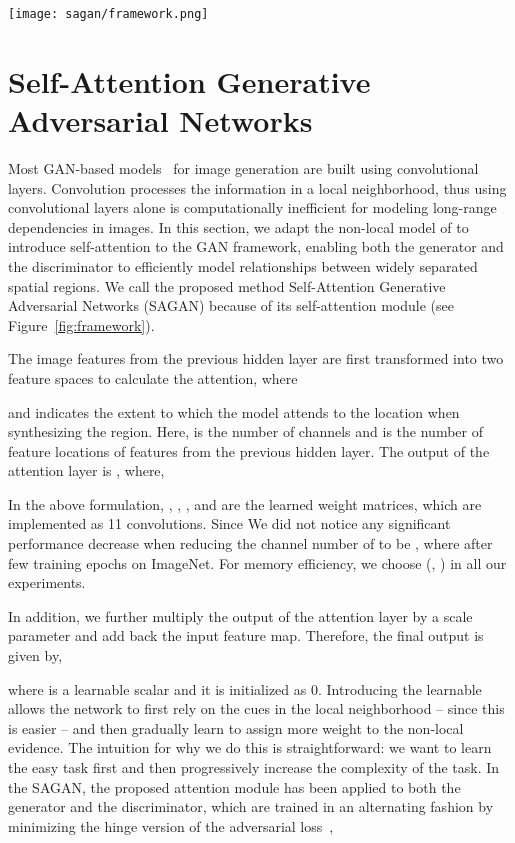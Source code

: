 \documentclass{article}
\begin{document}
\begin{figure*}[tb]
\centering
\texttt{[image: sagan/framework.png]}
\caption{The proposed self-attention module for the SAGAN. The  denotes matrix multiplication. The softmax operation is performed on each row.}
\label{fig:framework}
\end{figure*}



\section{Self-Attention Generative Adversarial Networks} \label{sec:sagan_sagan} 

Most GAN-based models~\cite{Radford15, Salimans2016, KarrasALL18} for image generation are built using convolutional layers. Convolution processes the information in a local neighborhood, thus using convolutional layers alone is computationally inefficient for modeling long-range dependencies in images.
In this section, we adapt the non-local model of \cite{Wang18} to introduce self-attention to the GAN framework, enabling both the generator and the discriminator to efficiently model relationships between widely separated spatial regions. We call the proposed method Self-Attention Generative Adversarial Networks (SAGAN) because of its self-attention module (see Figure~\ref{fig:framework}).


The image features from the previous hidden layer   are first transformed into two feature spaces  to calculate the attention, where 

and  indicates the extent to which the model attends to the  location when synthesizing the  region. Here,  is the number of channels and  is the number of feature locations of features from the previous hidden layer.
The output of the attention layer is , where,

In the above formulation, , , , and  are the learned weight matrices, which are implemented as  11 convolutions. 
Since We did not notice any significant performance decrease when reducing the channel number of  to be , where  after few training epochs on ImageNet. For memory efficiency, we choose  (\ie, ) in all our experiments. 


In addition, we further multiply the output of the attention layer by a scale parameter and add back the input feature map. Therefore, the final output is given by, 


where  is a learnable scalar and it is initialized as 0.
Introducing the learnable  allows the network to first rely on the cues in the local neighborhood -- since this is easier -- and then gradually learn to assign more weight to the non-local evidence.
The intuition for why we do this is straightforward: we want to learn the easy task first and then progressively increase the complexity of the task.
In the SAGAN, the proposed attention module has been applied to both the generator and the discriminator, which are trained in an alternating fashion by minimizing the hinge version of the adversarial loss~\cite{lim2017,Tran2017,Miyato18a},
\end{document}
